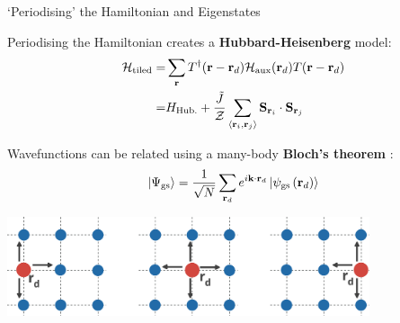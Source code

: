 \documentclass[12pt,aspectratio=169]{beamer}
\newcommand\focus[1]{%
	{\alert{\textbf{#1}}}
}
\begin{document}
\begin{frame}{`Periodising' the Hamiltonian and Eigenstates}
	\begin{minipage}{0.45\textwidth}
		Periodising the Hamiltonian creates a \focus{Hubbard-Heisenberg} model:
	\begin{equation*}\begin{aligned}
		\mathcal{H}_\text{tiled} =& \sum_{{\bf r}}T^\dagger({\bf r} - {\bf r}_d)\mathcal{H}_\text{aux}({\bf r}_d)T({\bf r} - {\bf r}_d)\\
								 =& H_\text{Hub.} + \frac{\tilde J}{\mathcal{Z}}\sum_{\left< {\bf r}_i, {\bf r}_j\right>} {\bf S}_{{\bf r}_i}\cdot{\bf S}_{{\bf r}_j}
	\end{aligned}\end{equation*}
	\end{minipage}
	\hspace{\fill}
	\begin{minipage}{0.45\textwidth}
		Wavefunctions can be related using a many-body \focus{Bloch's theorem}:
	\[\ket{\Psi_\text{gs}} = \frac{1}{\sqrt N}\sum_{{\bf r}_d} e^{i {\bf k}\cdot{\bf r}_d} \ket{\psi_\text{gs}\left({\bf r}_d\right)}\]
	\end{minipage}
	\includegraphics[width=0.8\textwidth]{periodisation.pdf}
	
\end{frame}
\end{document}
